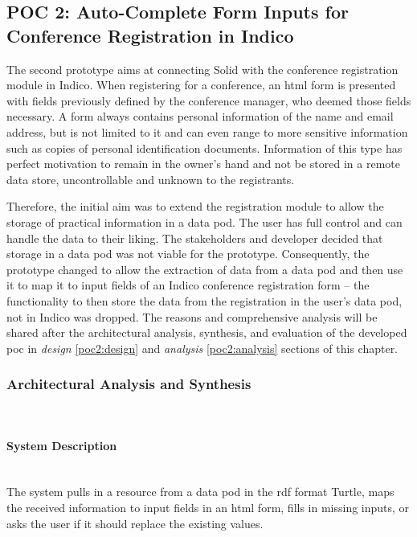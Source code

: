 \subsection{POC 2: Auto-Complete Form Inputs for Conference Registration in Indico}

The second prototype aims at connecting Solid with the conference registration module in Indico. When registering for a conference, an \gls{html} form is presented with fields previously defined by the conference manager, who deemed those fields necessary. A form always contains personal information of the name and email address, but is not limited to it and can even range to more sensitive information such as copies of personal identification documents. Information of this type has perfect motivation to remain in the owner's hand and not be stored in a remote data store, uncontrollable and unknown to the registrants.

Therefore, the initial aim was to extend the registration module to allow the storage of practical information in a data pod. The user has full control and can handle the data to their liking. The stakeholders and developer decided that storage in a data pod was not viable for the prototype. Consequently, the prototype changed to allow the extraction of data from a data pod and then use it to map it to input fields of an Indico conference registration form -- the functionality to then store the data from the registration in the user's data pod, not in Indico was dropped. The reasons and comprehensive analysis will be shared after the architectural analysis, synthesis, and evaluation of the developed \gls{poc} in \textit{design} \ref{poc2:design} and \textit{analysis} \ref{poc2:analysis} sections of this chapter.

\subsubsection{Architectural Analysis and Synthesis}\mbox{}\\

\paragraph{System Description}\mbox{}\\

The system pulls in a resource from a data pod in the \gls{rdf} format Turtle, maps the received information to input fields in an \gls{html} form, fills in missing inputs, or asks the user if it should replace the existing values.

